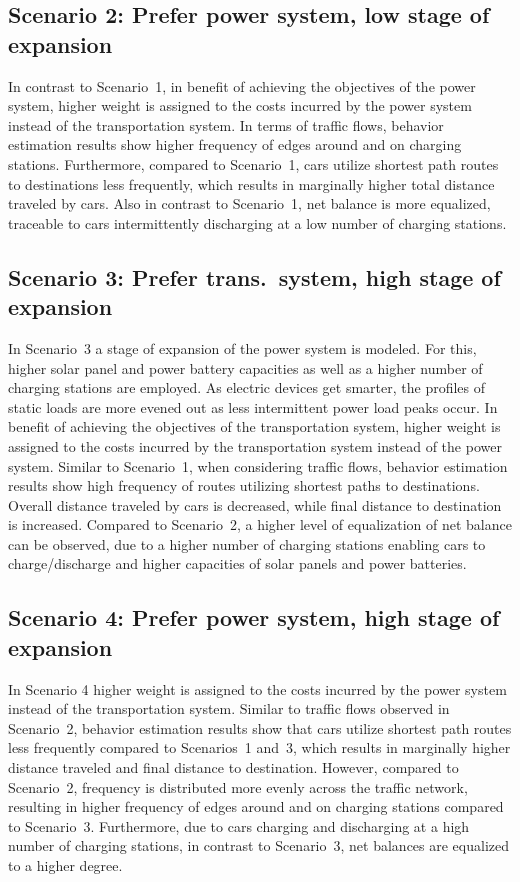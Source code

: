 \subsection*{Scenario 2: Prefer power system, low stage of expansion}

In contrast to Scenario~1, in benefit of achieving the objectives of the power system, higher weight is assigned to the costs incurred by the power system instead of the transportation system. In terms of traffic flows, behavior estimation results show higher frequency of edges around and on charging stations. Furthermore, compared to Scenario~1, cars utilize shortest path routes to destinations less frequently, which results in marginally higher total distance traveled by cars. Also in contrast to Scenario~1, net balance is more equalized, traceable to cars intermittently discharging at a low number of charging stations.

\subsection*{Scenario 3: Prefer trans.\ system, high stage of expansion}

In Scenario~3 a stage of expansion of the power system is modeled. For this, higher solar panel and power battery capacities as well as a higher number of charging stations are employed. As electric devices get smarter, the profiles of static loads are more evened out as less intermittent power load peaks occur. In benefit of achieving the objectives of the transportation system, higher weight is assigned to the costs incurred by the transportation system instead of the power system. Similar to Scenario~1, when considering traffic flows, behavior estimation results show high frequency of routes utilizing shortest paths to destinations. Overall distance traveled by cars is decreased, while final distance to destination is increased. Compared to Scenario~2, a higher level of equalization of net balance can be observed, due to a higher number of charging stations enabling cars to charge/discharge and higher capacities of solar panels and power batteries.

\subsection*{Scenario 4: Prefer power system, high stage of expansion}

In Scenario 4 higher weight is assigned to the costs incurred by the power system instead of the transportation system. Similar to traffic flows observed in Scenario~2, behavior estimation results show that cars utilize shortest path routes less frequently compared to Scenarios~1 and~3, which results in marginally higher distance traveled and final distance to destination. However, compared to Scenario~2, frequency is distributed more evenly across the traffic network, resulting in higher frequency of edges around and on charging stations compared to Scenario~3. Furthermore, due to cars charging and discharging at a high number of charging stations, in contrast to Scenario~3, net balances are equalized to a higher degree.